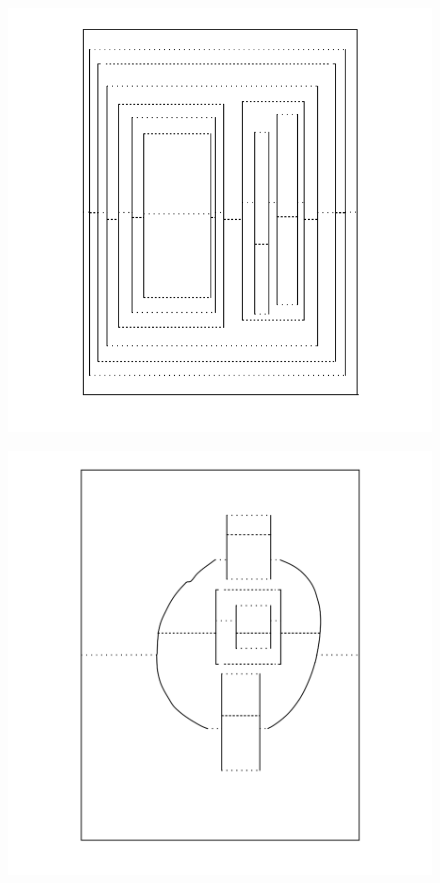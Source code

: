 \begin{figure}[htbp]
\centering
\includegraphics{figures/92_Appendix_Visual_Aids_Materials/lined_card4.png}
\caption{}
\end{figure}

\begin{figure}[htbp]
\centering
\includegraphics{figures/92_Appendix_Visual_Aids_Materials/lined_card5.png}
\caption{}
\end{figure}

